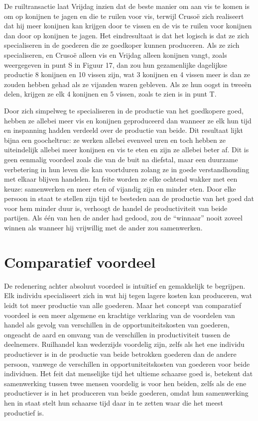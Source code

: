 De ruiltransactie laat Vrijdag inzien dat de beste manier om aan vis te komen is om op konijnen te jagen en die te ruilen voor vis, terwijl Crusoë zich realiseert dat hij meer konijnen kan krijgen door te vissen en de vis te ruilen voor konijnen dan door op konijnen te jagen. Het eindresultaat is dat het logisch is dat ze zich specialiseren in de goederen die ze goedkoper kunnen produceren. Als ze zich specialiseren, en Crusoë alleen vis en Vrijdag alleen konijnen vangt, zoals weergegeven in punt S in Figuur 17, dan zou hun gezamenlijke dagelijkse productie 8 konijnen en 10 vissen zijn, wat 3 konijnen en 4 vissen meer is dan ze zouden hebben gehad als ze vijanden waren gebleven. Als ze hun oogst in tweeën delen, krijgen ze elk 4 konijnen en 5 vissen, zoals te zien is in punt T.

Door zich simpelweg te specialiseren in de productie van het goedkopere goed, hebben ze allebei meer vis en konijnen geproduceerd dan wanneer ze elk hun tijd en inspanning hadden verdeeld over de productie van beide. Dit resultaat lijkt bijna een goocheltruc: ze werken allebei evenveel uren en toch hebben ze uiteindelijk allebei meer konijnen en vis te eten en zijn ze allebei beter af. Dit is geen eenmalig voordeel zoals die van de buit na diefstal, maar een duurzame verbetering in hun leven die kan voortduren zolang ze in goede verstandhouding met elkaar blijven handelen. In feite worden ze elke ochtend wakker met een keuze: samenwerken en meer eten of vijandig zijn en minder eten. Door elke persoon in staat te stellen zijn tijd te besteden aan de productie van het goed dat voor hem minder duur is, verhoogt de handel de productiviteit van beide partijen. Als één van hen de ander had gedood, zou de ``winnaar'' nooit zoveel winnen als wanneer hij vrijwillig met de ander zou samenwerken.

\hypertarget{comparatief-voordeel}{%
\section{Comparatief voordeel}\label{comparatief-voordeel}}

De redenering achter absoluut voordeel is intuïtief en gemakkelijk te begrijpen. Elk individu specialiseert zich in wat hij tegen lagere kosten kan produceren, wat leidt tot meer productie van alle goederen. Maar het concept van comparatief voordeel is een meer algemene en krachtige verklaring van de voordelen van handel als gevolg van verschillen in de opportuniteitskosten van goederen, ongeacht de aard en omvang van de verschillen in productiviteit tussen de deelnemers. Ruilhandel kan wederzijds voordelig zijn, zelfs als het ene individu productiever is in de productie van beide betrokken goederen dan de andere persoon, vanwege de verschillen in opportuniteitskosten van goederen voor beide individuen. Het feit dat menselijke tijd het ultieme schaarse goed is, betekent dat samenwerking tussen twee mensen voordelig is voor hen beiden, zelfs als de ene productiever is in het produceren van beide goederen, omdat hun samenwerking hen in staat stelt hun schaarse tijd daar in te zetten waar die het meest productief is.

